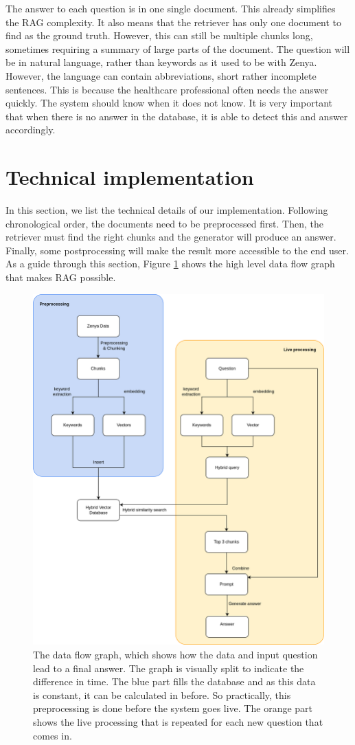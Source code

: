 The answer to each question is in one single document. This already simplifies the RAG complexity. It also means that the retriever has only one document to find as the ground truth. However, this can still be multiple chunks long, sometimes requiring a summary of large parts of the document.
The question will be in natural language, rather than keywords as it used to be with Zenya. However, the language can contain abbreviations, short rather incomplete sentences. This is because the healthcare professional often needs the answer quickly.
The system should know when it does not know. It is very important that when there is no answer in the database, it is able to detect this and answer accordingly.

\section{Technical implementation}
In this section, we list the technical details of our implementation. Following chronological order, the documents need to be preprocessed first. Then, the retriever must find the right chunks and the generator will produce an answer. Finally, some postprocessing will make the result more accessible to the end user. As a guide through this section, Figure \ref{fig:dataflow_graph} shows the high level data flow graph that makes RAG possible.

\begin{figure}[H]
    \centerline{\includegraphics[width=0.8\linewidth]{fig/dataflow_graph.png}}
    \caption{The data flow graph, which shows how the data and input question lead to a final answer. The graph is visually split to indicate the difference in time. The blue part fills the database and as this data is constant, it can be calculated in before. So practically, this preprocessing is done before the system goes live. The orange part shows the live processing that is repeated for each new question that comes in.}
    \label{fig:dataflow_graph}
\end{figure}

